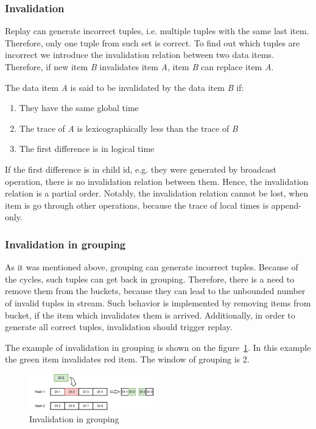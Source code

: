 \subsubsection{Invalidation}
Replay can generate incorrect tuples, i.e. multiple tuples with the same last item. Therefore, only one tuple from such set is correct. To find out which tuples are incorrect we introduce the invalidation relation between two data items. Therefore, if new item {\it B} invalidates item {\it A}, item {\it B} can replace item {\it A}.

The data item {\it A} is said to be invalidated by the data item {\it B} if:
\begin{enumerate}
\item They have the same global time
\item The trace of {\it A} is lexicographically less than the trace of {\it B}
\item The first difference is in logical time
\end{enumerate}
If the first difference is in child id, e.g. they were generated by broadcast operation, there is no invalidation relation between them. Hence, the invalidation relation is a partial order. Notably, the invalidation relation cannot be lost, when item is go through other operations, because the trace of local times is append-only.

\subsubsection{Invalidation in grouping}
As it was mentioned above, grouping can generate incorrect tuples. Because of the cycles, such tuples can get back in grouping. Therefore, there is a need to remove them from the buckets, because they can lead to the unbounded number of invalid tuples in stream. Such behavior is implemented by removing items from bucket, if the item which invalidates them is arrived. Additionally, in order to generate all correct tuples, invalidation should trigger replay. 

The example of invalidation in grouping is shown on the figure~\ref{grouping-invalidation-figure}. In this example the green item invalidates red item. The window of grouping is 2.

\begin{figure}[htbp]
  \centering
  \includegraphics[width=0.48\textwidth]{pics/grouping-invalidation}
  \caption{Invalidation in grouping}
  \label {grouping-invalidation-figure}
\end{figure}

